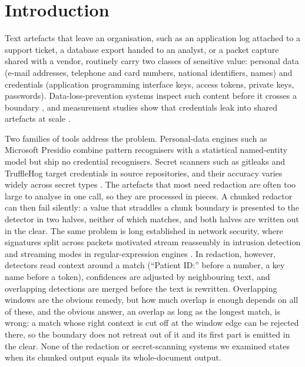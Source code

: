 \documentclass[pdflatex,sn-mathphys-num]{sn-jnl}
\theoremstyle{thmstyleone}
\theoremstyle{thmstylethree}
\begin{document}
\maketitle

\section{Introduction}\label{sec:intro}

Text artefacts that leave an organisation, such as an application log attached to a support ticket, a database export handed to an analyst, or a packet capture shared with a vendor, routinely carry two classes of sensitive value: personal data (e-mail addresses, telephone and card numbers, national identifiers, names) and credentials (application programming interface keys, access tokens, private keys, passwords). Data-loss-prevention systems inspect such content before it crosses a boundary \cite{alneyadi2016dlp}, and measurement studies show that credentials leak into shared artefacts at scale \cite{meli2019git,krause2023pushed}.

Two families of tools address the problem. Personal-data engines such as Microsoft Presidio \cite{presidio} combine pattern recognisers with a statistical named-entity model but ship no credential recognisers. Secret scanners such as gitleaks \cite{gitleaks} and TruffleHog \cite{trufflehog} target credentials in source repositories, and their accuracy varies widely across secret types \cite{basak2023comparative}. The artefacts that most need redaction are often too large to analyse in one call, so they are processed in pieces. A chunked redactor can then fail silently: a value that straddles a chunk boundary is presented to the detector in two halves, neither of which matches, and both halves are written out in the clear. The same problem is long established in network security, where signatures split across packets motivated stream reassembly in intrusion detection \cite{ptacek1998insertion} and streaming modes in regular-expression engines \cite{wang2019hyperscan,intel2019hyperscanintro}. In redaction, however, detectors read context around a match (``Patient ID:'' before a number, a key name before a token), confidences are adjusted by neighbouring text, and overlapping detections are merged before the text is rewritten. Overlapping windows are the obvious remedy, but how much overlap is enough depends on all of these, and the obvious answer, an overlap as long as the longest match, is wrong: a match whose right context is cut off at the window edge can be rejected there, so the boundary does not retreat out of it and its first part is emitted in the clear. None of the redaction or secret-scanning systems we examined states when its chunked output equals its whole-document output.
\end{document}
